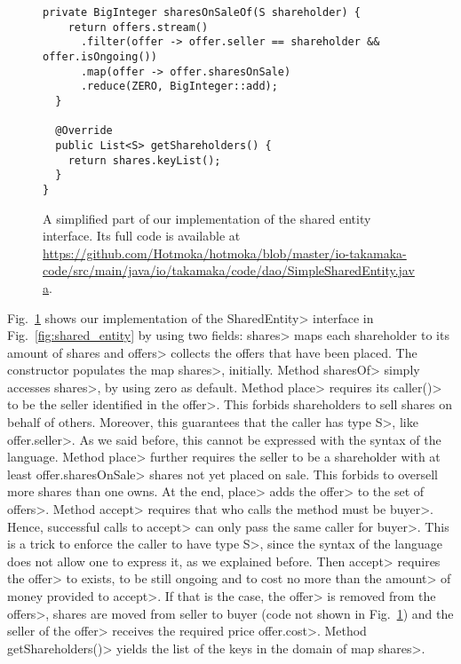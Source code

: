 \begin{figure}[htbp]
\begin{center}
\begin{lstlisting}[language=Takamaka]
  private BigInteger sharesOnSaleOf(S shareholder) {
    return offers.stream()
      .filter(offer -> offer.seller == shareholder && offer.isOngoing())
      .map(offer -> offer.sharesOnSale)
      .reduce(ZERO, BigInteger::add);
  }

  @Override
  public List<S> getShareholders() {
    return shares.keyList();
  }
}
    \end{lstlisting}
  \end{center}
  \caption{A simplified part of our implementation of the shared entity interface.
  Its full code is available at \url{https://github.com/Hotmoka/hotmoka/blob/master/io-takamaka-code/src/main/java/io/takamaka/code/dao/SimpleSharedEntity.java}.}\label{fig:simple_shared_entity}
\end{figure}

Fig.~\ref{fig:simple_shared_entity} shows our implementation of the \<SharedEntity> interface
in Fig.~\ref{fig:shared_entity}
by using two fields: \<shares> maps each shareholder to its amount of shares and
\<offers> collects the offers that have been placed.
The constructor populates the map \<shares>, initially.
Method \<sharesOf> simply accesses
\<shares>, by using zero as default. Method \<place> requires its \<caller()> to be
the seller identified in the \<offer>. This forbids shareholders to sell shares on behalf of others.
Moreover, this guarantees that the caller has type \<S>, like \<offer.seller>.
As we said before, this cannot be expressed with the syntax of the language.
Method \<place> further requires the seller to be a shareholder with at least \<offer.sharesOnSale>
shares not yet placed on sale. This forbids to oversell more shares
than one owns. At the end, \<place> adds the \<offer> to the set of \<offers>.
Method \<accept> requires that who calls the method must be \<buyer>. Hence, successful
calls to \<accept> can only pass the same caller for \<buyer>. This is a trick to enforce the
caller to have type \<S>, since the syntax of the language does not allow one to express it,
as we explained before. Then \<accept> requires the \<offer> to exists, to be still ongoing
and to cost no more than the \<amount> of money provided to \<accept>. If that is the case,
the \<offer> is removed from the \<offers>, shares are moved from seller to buyer (code not
shown in Fig.~\ref{fig:simple_shared_entity}) and the seller of the \<offer>
receives the required price \<offer.cost>.
Method \<getShareholders()> yields the list of the keys in the domain of map \<shares>.

